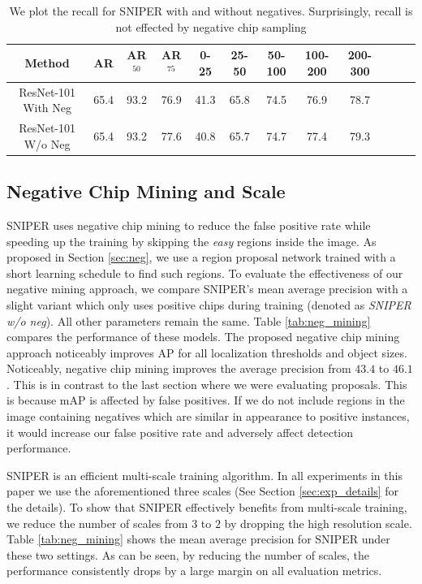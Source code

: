 \documentclass{article}
\begin{document}
\begin{table}[t]
\begin{center}
\small
\setlength\tabcolsep{5pt}
\begin{tabular}{|c|c|c|c|c|c|c|c|c|c|c|c|}
  \hline
  Method & AR & AR$^{50}$ & AR$^{75}$ & 0-25 & 25-50 & 50-100  & 100-200 & 200-300\\
  \hline\hline
  ResNet-101 With Neg & 65.4 & 93.2 & 76.9 & 41.3 & 65.8 & 74.5 & 76.9 & 78.7 \\
  ResNet-101 W/o Neg & 65.4 & 93.2 & 77.6 & 40.8 & 65.7 & 74.7 & 77.4 & 79.3 \\
  \hline
 \end{tabular}
 \newline
 \caption{We plot the recall for SNIPER with and without negatives. Surprisingly, recall is not effected by negative chip sampling}
\label{tab:rpn_bbox}
\end{center}
\end{table}
\subsection{Negative Chip Mining and Scale}
\label{sec:neg_mining}
SNIPER uses negative chip mining to reduce the false positive rate while speeding up the training by skipping the \textit{easy} regions inside the image. As proposed in Section \ref{sec:neg}, we use a region proposal network trained with a short learning schedule to find such regions. To evaluate the effectiveness of our negative mining approach, we compare SNIPER's mean average precision with a slight variant which only uses positive chips during training (denoted as \textit{SNIPER w/o neg}). All other parameters remain the same. Table \ref{tab:neg_mining} compares the performance of these models. The proposed negative chip mining approach noticeably improves AP for all localization thresholds and object sizes. Noticeably, negative chip mining improves the average precision from $43.4$ to $46.1$. This is in contrast to the last section where we were evaluating proposals. This is because mAP is affected by false positives. If we do not include regions in the image containing negatives which are similar in appearance to positive instances, it would increase our false positive rate and adversely affect detection performance.


SNIPER is an efficient multi-scale training algorithm. In all experiments in this paper we use the aforementioned three scales (See Section \ref{sec:exp_details} for the details). To show that SNIPER effectively benefits from multi-scale training, we reduce the number of scales from $3$ to $2$ by dropping the high resolution scale. Table \ref{tab:neg_mining} shows the mean average precision for SNIPER under these two settings. As can be seen, by reducing the number of scales, the performance consistently drops by a large margin on all evaluation metrics. 
\end{document}
